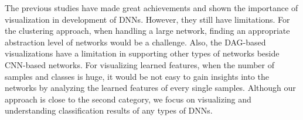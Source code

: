 The previous studies have made great achievements and shown the importance of visualization in development of DNNs.
However, they still have limitations.
For the clustering approach, when handling a large network, finding an appropriate abstraction level of networks would be a challenge.
Also, the DAG-based visualizations have a limitation in supporting other types of networks beside CNN-based networks.
For visualizing learned features, when the number of samples and classes is huge, it would be not easy to gain insights into the networks by analyzing the learned features of every single samples.
Although our approach is close to the second category, we focus on visualizing and understanding classification results of any types of DNNs.


